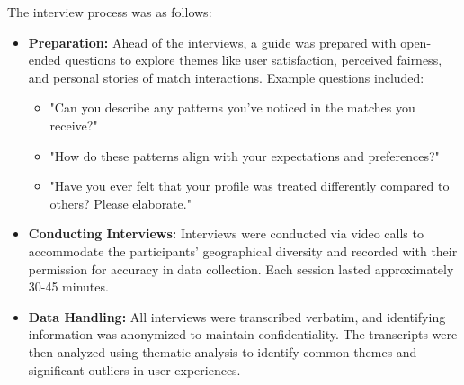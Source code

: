 The interview process was as follows:
\begin{itemize}
    \item \textbf{Preparation:} Ahead of the interviews, a guide was prepared with open-ended questions to explore themes like user satisfaction, perceived fairness, and personal stories of match interactions. Example questions included:
    \begin{itemize}
        \item "Can you describe any patterns you've noticed in the matches you receive?"
        \item "How do these patterns align with your expectations and preferences?"
        \item "Have you ever felt that your profile was treated differently compared to others? Please elaborate."
    \end{itemize}
    \item \textbf{Conducting Interviews:} Interviews were conducted via video calls to accommodate the participants' geographical diversity and recorded with their permission for accuracy in data collection. Each session lasted approximately 30-45 minutes.
    \item \textbf{Data Handling:} All interviews were transcribed verbatim, and identifying information was anonymized to maintain confidentiality. The transcripts were then analyzed using thematic analysis to identify common themes and significant outliers in user experiences.
\end{itemize}

